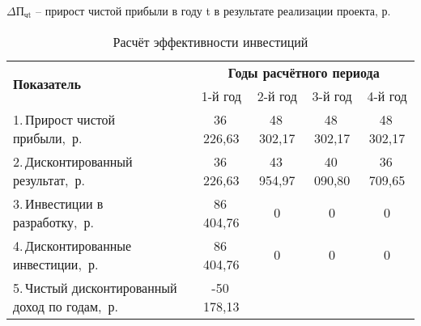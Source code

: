 $\Delta\text{П}_{\text{чt}}$  – прирост чистой прибыли в году t в результате реализации проекта, р.
\begin{table}[!h!t]
	\caption{Расчёт эффективности инвестиций}
	\label{tab3}
	\centering
	\begin{tabular}{|p{6.3cm}|c|c|c|c|}
		\hline
		\multirow{2}{6.3cm}{\textbf{Показатель}}                 & \multicolumn{4}{c|}{\textbf{Годы расчётного периода}}                               \\
		\cline{2-5}
		                                                         & 1-й год                                               & 2-й год & 3-й год & 4-й год \\
		\hline
		1.\,Прирост чистой прибыли,~р.                           &
		36\,226,63                                                        &
		48\,302,17                                              &
		48\,302,17                                              &
		48\,302,17                                                                                                                                    \\
		\hline
		2.\,Дисконтированный результат,~р.                       &
		36\,226,63                                                        &
		43\,954,97                                              &
		40\,090,80                                             &
		36\,709,65                                                                                                                                    \\
		\hline
		3.\,Инвестиции в разработку,~р.                          &
		86\,404,76                                               &
		0                                                        &
		0                                                        &
		0                                                                                                                                              \\
		\hline
		4.\,Дисконтированные инвестиции,~р.                      &
		86\,404,76                                               &
		0                                                        &
		0                                                        &
		0                                                                                                                                              \\
		\hline
		5.\,Чистый дисконтированный доход по годам,~р.           &
		-50\,178,13                                              &

\end{tabular}
\end{table}
